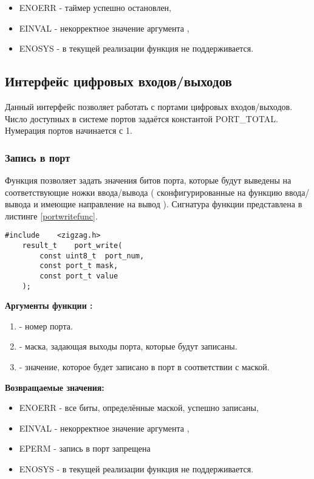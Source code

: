 {\itshape
\begin{itemize}
\item ENOERR - таймер успешно остановлен,
\item EINVAL - некорректное значение аргумента ,
\item ENOSYS - в текущей реализации функция не поддерживается.
\end{itemize}
}

\subsection{Интерфейс цифровых входов/выходов}
    Данный интерфейс позволяет работать с портами цифровых входов/выходов. Число доступных в системе
портов задаётся константой PORT\_TOTAL. Нумерация портов начинается с 1.

\subsubsection{Запись в порт}
    Функция  позволяет задать значения битов порта, которые будут выведены 
на соответствующие ножки ввода/вывода ( сконфигурированные на функцию ввода/вывода и имеющие
направление на вывод ). Сигнатура функции представлена в листинге \ref{portwritefunc}.
\begin{lstlisting}[caption=\myfunc{port\_write()} - запись в порт, label=portwritefunc ]
    #include    <zigzag.h>
    result_t    port_write( 
        const uint8_t  port_num, 
        const port_t mask, 
        const port_t value 
    );
\end{lstlisting}

{\bfseries Аргументы функции :}

{\itshape
\begin{enumerate}
\item {} - номер порта.
\item {} - маска, задающая выходы порта, которые будут записаны.
\item {} - значение, которое будет записано в порт в соответствии с маской.
\end{enumerate}
}

{\bfseries Возвращаемые значения:}

{\itshape
\begin{itemize}
\item ENOERR - все биты, определённые маской, успешно записаны,
\item EINVAL - некорректное значение аргумента ,
\item EPERM - запись в порт запрещена
\item ENOSYS - в текущей реализации функция не поддерживается.
\end{itemize}
}

